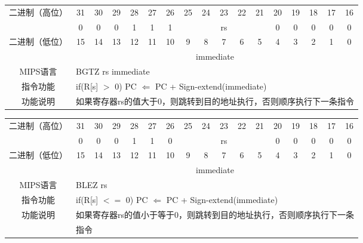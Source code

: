 \begin{table}
\begin{tabular}{|c|c|c|c|c|c|c|c|c|c|c|c|c|c|c|c|c|}
\hline
\multirow{2}{*}{二进制（高位）} &
31&30&29&28&27&26&25&24&23&22&21&20&19&18&17&16\\
\cline{2-17}
&
0&0&0&1&1&
1&
\multicolumn{5}{c|}{rs}&
0&0&0&0&0\\
\hline
\multirow{2}{*}{二进制（低位）} &
15&14&13&12&11&10&9&8&7&6&5&4&3&2&1&0\\
\cline{2-17}
&
\multicolumn{16}{c|}{immediate}\\
\hline
MIPS语言&
\multicolumn{16}{l|}{BGTZ rs immediate}\\
\hline
指令功能&
\multicolumn{16}{l|}{if(R[s] $>$ 0) PC $\Leftarrow$ PC + Sign-extend(immediate)}\\
\hline
功能说明&
\multicolumn{16}{l|}{如果寄存器rs的值大于0，则跳转到目的地址执行，否则顺序执行下一条指令}\\
\hline
\end{tabular}
\end{table}

\begin{table}
\begin{tabular}{|c|c|c|c|c|c|c|c|c|c|c|c|c|c|c|c|c|}
\hline
\multirow{2}{*}{二进制（高位）} &
31&30&29&28&27&26&25&24&23&22&21&20&19&18&17&16\\
\cline{2-17}
&
0&0&0&1&1&
0&
\multicolumn{5}{c|}{rs}&
0&0&0&0&0\\
\hline
\multirow{2}{*}{二进制（低位）} &
15&14&13&12&11&10&9&8&7&6&5&4&3&2&1&0\\
\cline{2-17}
&
\multicolumn{16}{c|}{immediate}\\
\hline
MIPS语言&
\multicolumn{16}{l|}{BLEZ rs}\\
\hline
指令功能&
\multicolumn{16}{l|}{if(R[s] $<=$ 0) PC $\Leftarrow$ PC + Sign-extend(immediate)}\\
\hline
\multirow{2}{*}{功能说明}&
\multicolumn{16}{l|}{如果寄存器rs的值小于等于0，则跳转到目的地址执行，否则顺序执行下一条}\\
&\multicolumn{16}{l|}{指令}\\
\hline
\end{tabular}
\end{table}

\clearpage

